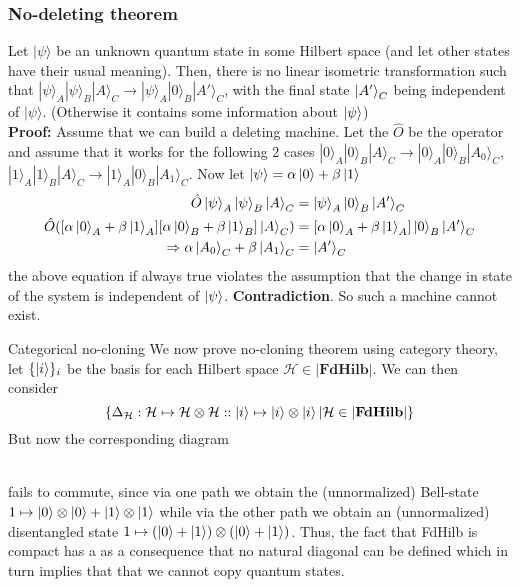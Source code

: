 \documentclass[11pt]{beamer}
\begin{document}
\begin{frame}
\frametitle{No-deleting theorem}
Let ${\displaystyle |\psi \rangle }$ be an unknown quantum state in some Hilbert space (and let other states have their usual meaning). Then, there is no linear isometric transformation such that $ {\displaystyle |\psi \rangle _{A}|\psi \rangle _{B}|A\rangle _{C}\rightarrow |\psi \rangle _{A}|0\rangle _{B}|A'\rangle _{C}}$, with the final state $\ket{A'}_C$ being independent of ${\displaystyle |\psi \rangle }$. (Otherwise it contains some information about $\ket{\psi}$)\\
\textbf{Proof:} Assume that we can build a deleting machine. Let the $\hat{O}$ be the operator and assume that it works for the following 2 cases ${\displaystyle |0\rangle _{A}|0\rangle _{B}|A\rangle _{C}\rightarrow |0\rangle _{A}|0\rangle _{B}|A_{0}\rangle _{C}}$, $|1\rangle _{A}|1\rangle _{B}|A\rangle _{C}\rightarrow |1\rangle _{A}|0\rangle _{B}|A_{1}\rangle _{C}$. Now let $\ket{\psi}=\alpha\ket{0}+\beta\ket{1}$
\begin{align*}
    \hat{O}\ket{\psi}_A\ket{\psi}_B\ket{A}_C&=\ket{\psi}_A\ket{0}_B\ket{A'}_C\\
    \hat{O}([\alpha\ket{0}_A+\beta\ket{1}_A][\alpha\ket{0}_B+\beta\ket{1}_B]\ket{A}_C) &=[\alpha\ket{0}_A+\beta\ket{1}_A]\ket{0}_B\ket{A'}_C\\
\Rightarrow \alpha\ket{A_0}_C+\beta\ket{A_1}_C &=\ket{A'}_C
\end{align*}
the above equation if always true violates the assumption that the change in state of the system is independent of $\ket{\psi}$. \textbf{Contradiction}. So such a machine cannot exist.
\end{frame}
\begin{frame}{Categorical no-cloning}
    We now prove no-cloning theorem using category theory, let $\{\ket{i}\}_i$ be the basis for each Hilbert space $\mathcal{H}\in |\textbf{FdHilb}|$. We can then consider
    $$\{\Delta_{\mathcal{H}}:\mathcal{H}\mapsto\mathcal{H} \otimes  \mathcal{H}::\ket{i}\mapsto\ket{i}\otimes\ket{i}|\mathcal{H}\in |\textbf{FdHilb}|\}$$
    But now the corresponding diagram\\
\\
fails to commute, since via one path we obtain the (unnormalized) Bell-state $1\mapsto\ket{0}\otimes\ket{0}+\ket{1}\otimes\ket{1}$ while via the other path we obtain an (unnormalized) disentangled state $1\mapsto(\ket{0}+\ket{1})\otimes(\ket{0}+\ket{1})$. Thus, the fact that FdHilb is compact has a as a consequence that no natural diagonal can
be defined which in turn implies that that we cannot copy quantum states.
\end{frame}
\end{document}
